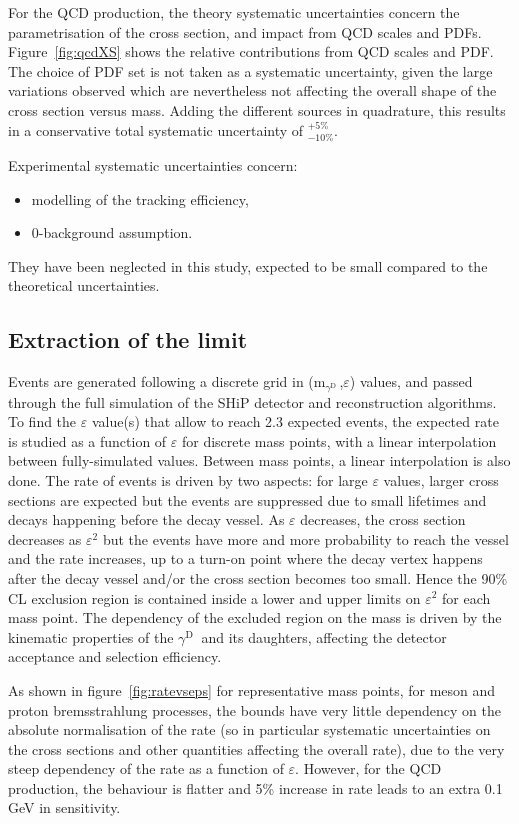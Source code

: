 \documentclass[12pt,a4paper,]{article}
\newcommand{\mathDP}{\gamma^{\mathrm{D}}\ }
\newcommand{\DP}{$\mathDP$}
\newcommand{\mDP}{m$_{\mathDP}$}
\begin{document}
For the QCD production, the theory systematic uncertainties concern
the parametrisation of the cross section, and impact from QCD scales
and PDFs. Figure~\ref{fig:qcdXS} shows the relative contributions from
QCD scales and PDF. The choice of PDF set is not taken as a systematic
uncertainty, given the large variations observed which are
nevertheless not affecting the overall shape of the cross section
versus mass. Adding the different sources in quadrature, this results
in a conservative total systematic uncertainty of $^{+5\%}_{-10\%}$.

Experimental systematic uncertainties concern:
\begin{itemize}
\item modelling of the tracking efficiency,
\item 0-background assumption.
\end{itemize}
They have been neglected in this study, expected to be small compared
to the theoretical uncertainties.

\subsection{Extraction of the limit}

Events are generated following a discrete grid in (\mDP,$\varepsilon$)
values, and passed through the full simulation of the SHiP detector
and reconstruction algorithms. To find the $\varepsilon$ value(s) that
allow to reach 2.3 expected events, the expected rate is studied as a
function of $\varepsilon$ for discrete mass points, with a linear
interpolation between fully-simulated values. Between mass points, a
linear interpolation is also done. The rate of events is driven by two
aspects: for large $\varepsilon$ values, larger cross sections are
expected but the events are suppressed due to small lifetimes and
decays happening before the decay vessel. As $\varepsilon$ decreases,
the cross section decreases as $\varepsilon^2$ but the events have
more and more probability to reach the vessel and the rate increases,
up to a turn-on point where the decay vertex happens after the decay
vessel and/or the cross section becomes too small. Hence the 90\% CL
exclusion region is contained inside a lower and upper limits on
$\varepsilon^2$ for each mass point. The dependency of the excluded
region on the mass is driven by the kinematic properties of the \DP
and its daughters, affecting the detector acceptance and selection
efficiency.

As shown in figure~\ref{fig:ratevseps} for representative mass points,
for meson and proton bremsstrahlung processes, the bounds have very
little dependency on the absolute normalisation of the rate (so in
particular systematic uncertainties on the cross sections and other
quantities affecting the overall rate), due to the very steep
dependency of the rate as a function of $\varepsilon$. However, for
the QCD production, the behaviour is flatter and 5\% increase in rate
leads to an extra 0.1 GeV in sensitivity.
\end{document}
